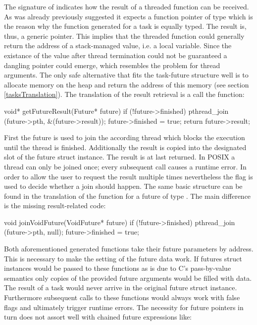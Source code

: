 The signature of  indicates how the result of a threaded function can be received. As was already previously suggested it expects a function pointer of type  which is the reason why the function generated for a task is equally typed. The result is, thus, a generic  pointer. This implies that the threaded function could generally return the address of a stack-managed value, i.e. a local variable. Since the existance of the value after thread termination could not be guaranteed a dangling pointer\cite{UnderstandingAndUsingCPointers} could emerge, which resembles the problem for thread arguments. The only safe alternative that fits the task-future structure well is to allocate memory on the heap and return the address of this memory (see section \ref{tasksTranslation}). The translation of the result retrieval is a call the function:

\begin{ccode}
void* getFutureResult(Future* future) { 
  if (!future->finished) { 
    pthread_join (future->pth, &(future->result)); 
    future->finished = true; 
  } 
  return future->result; 
} 
\end{ccode}
First the future is used to join the according thread which blocks the execution until the thread is finished. Additionally the result is copied into the designated slot of the future struct instance. The result is at last returned. In POSIX a thread can only be joined once; every subsequent call causes a runtime error. In order to allow the user to request the result multiple times nevertheless the  flag is used to decide whether a join should happen. The same basic structure can be found in the translation of the  function for a future of type . The main difference is the missing result-related code:
\begin{ccode}
void joinVoidFuture(VoidFuture* future) { 
  if (!future->finished) { 
    pthread_join (future->pth, null); 
    future->finished = true; 
  }
}
\end{ccode}
Both aforementioned generated functions take their future parameters by address. This is necessary to make the setting of the future data work. If futures struct instances would be passed to these functions as is due to C's pass-by-value semantics only copies of the provided future arguments would be filled with data. The result of a task would never arrive in the original future struct instance. Furthermore subsequent calls to these functions would always work with false  flags and ultimately trigger runtime errors. The necessity for future pointers in turn does not assort well with chained future expressions like:

